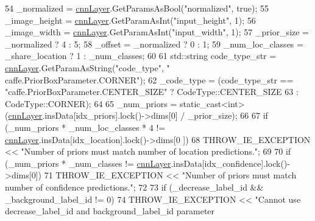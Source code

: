 \begin{DoxyCode}
54             \_normalized = \hyperlink{classInferenceEngine_1_1Extensions_1_1Cpu_1_1ExtLayerBase_a1074cdccacb9e9ca6eec01bbc2f7ca4a}{cnnLayer}.GetParamsAsBool(\textcolor{stringliteral}{"normalized"}, \textcolor{keyword}{true});
55             \_image\_height = \hyperlink{classInferenceEngine_1_1Extensions_1_1Cpu_1_1ExtLayerBase_a1074cdccacb9e9ca6eec01bbc2f7ca4a}{cnnLayer}.GetParamAsInt(\textcolor{stringliteral}{"input\_height"}, 1);
56             \_image\_width = \hyperlink{classInferenceEngine_1_1Extensions_1_1Cpu_1_1ExtLayerBase_a1074cdccacb9e9ca6eec01bbc2f7ca4a}{cnnLayer}.GetParamAsInt(\textcolor{stringliteral}{"input\_width"}, 1);
57             \_prior\_size = \_normalized ? 4 : 5;
58             \_offset = \_normalized ? 0 : 1;
59             \_num\_loc\_classes = \_share\_location ? 1 : \_num\_classes;
60 
61             std::string code\_type\_str = \hyperlink{classInferenceEngine_1_1Extensions_1_1Cpu_1_1ExtLayerBase_a1074cdccacb9e9ca6eec01bbc2f7ca4a}{cnnLayer}.GetParamAsString(\textcolor{stringliteral}{"code\_type"}, \textcolor{stringliteral}{"
      caffe.PriorBoxParameter.CORNER"});
62             \_code\_type = (code\_type\_str == \textcolor{stringliteral}{"caffe.PriorBoxParameter.CENTER\_SIZE"} ? CodeType::CENTER\_SIZE
63                                                                                  : CodeType::CORNER);
64 
65             \_num\_priors = \textcolor{keyword}{static\_cast<}\textcolor{keywordtype}{int}\textcolor{keyword}{>}(\hyperlink{classInferenceEngine_1_1Extensions_1_1Cpu_1_1ExtLayerBase_a1074cdccacb9e9ca6eec01bbc2f7ca4a}{cnnLayer}.insData[idx\_priors].lock()->dims[0] / 
      \_prior\_size);
66 
67             \textcolor{keywordflow}{if} (\_num\_priors * \_num\_loc\_classes * 4 != \hyperlink{classInferenceEngine_1_1Extensions_1_1Cpu_1_1ExtLayerBase_a1074cdccacb9e9ca6eec01bbc2f7ca4a}{cnnLayer}.insData[idx\_location].lock()->dims[0
      ])
68                 THROW\_IE\_EXCEPTION << \textcolor{stringliteral}{"Number of priors must match number of location predictions."};
69 
70             \textcolor{keywordflow}{if} (\_num\_priors * \_num\_classes != \hyperlink{classInferenceEngine_1_1Extensions_1_1Cpu_1_1ExtLayerBase_a1074cdccacb9e9ca6eec01bbc2f7ca4a}{cnnLayer}.insData[idx\_confidence].lock()->dims[0])
71                 THROW\_IE\_EXCEPTION << \textcolor{stringliteral}{"Number of priors must match number of confidence predictions."};
72 
73             \textcolor{keywordflow}{if} (\_decrease\_label\_id && \_background\_label\_id != 0)
74                 THROW\_IE\_EXCEPTION << \textcolor{stringliteral}{"Cannot use decrease\_label\_id and background\_label\_id parameter
}
\end{DoxyCode}
